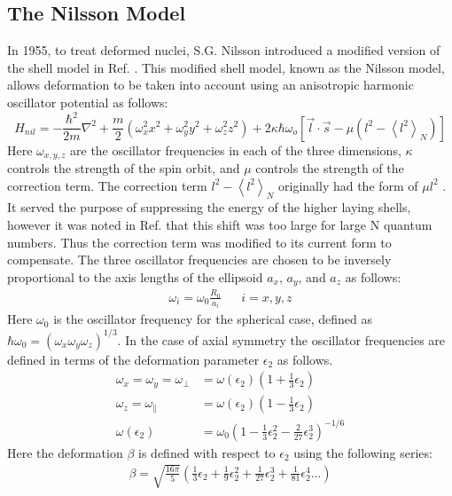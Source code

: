 \subsection{The Nilsson Model}
In 1955, to treat deformed nuclei, S.G. Nilsson introduced a modified version of the shell model in Ref. \cite{nilsson}. This modified shell model, known as the Nilsson model, allows deformation to be taken into account using an anisotropic harmonic oscillator potential as follows:
\begin{equation}
\label{eqn:chp2-nilsson-hamil}
H_{nil}=-\frac{\hbar^{2}}{2m}\nabla^{2} + \frac{m}{2}\left(\omega_{x}^{2}x^{2} + \omega_{y}^{2}y^{2} + \omega_{z}^{2}z^{2}\right) + 2\kappa \hbar \omega_{o}\left[\vec{l}\cdot \vec{s} - \mu \left(l^{2} - \left \langle l^{2} \right \rangle_{N} \right) \right]
\end{equation} 
Here $\omega_{x,y,z}$ are the oscillator frequencies in each of the three dimensions, $\kappa$ controls the strength of the spin orbit, and $\mu$ controls the strength of the correction term. The correction term $l^2 - \left \langle l^{2} \right \rangle_{N}$ originally had the form of $\mu l^2$ \cite{nilsson}. It served the purpose of suppressing the energy of the higher laying shells, however it was noted in Ref. \cite{nilssonCorrection} that this shift was too large for large N quantum numbers. Thus the correction term was modified to its current form to compensate. The three oscillator frequencies are chosen to be inversely proportional to the axis lengths of the ellipsoid $a_x$, $a_y$, and $a_z$ as follows:
\begin{align}
\label{eqn:chp2-nilsson-oscilator-freq}
\omega_i = \omega_0\frac{R_0}{a_i} &  & i=x,y,z
\end{align}
Here $\omega_0$ is the oscillator frequency for the spherical case, defined as $\hbar\omega_0 = (\omega_x \omega_y \omega_z )^{1/3}$. In the case of axial symmetry the oscillator frequencies are defined in terms of the deformation parameter $\epsilon_2$ as follows.
\begin{align}
\label{eqn:chp2-nilsson-oscilator-freq-components}
\omega_{x}=\omega_{y}=\omega_{\bot}&=\omega(\epsilon_2)\left(1+\frac{1}{3}\epsilon_2 \right)\\
\omega_{z}=\omega_{\parallel}&=\omega(\epsilon_2)\left(1-\frac{1}{3}\epsilon_2 \right)\\
\omega(\epsilon_2) &= \omega_0\left(1-\frac{1}{3}\epsilon_2^2-\frac{2}{27}\epsilon_2^3\right)^{-1/6}
\end{align}
Here the deformation $\beta$ is defined with respect to $\epsilon_2$ using the following series:
\begin{align}
\label{eqn:chp2-nilsson-beta-from-epsilon}
\beta = \sqrt{\frac{16 \pi}{5}}\left( \frac{1}{3}\epsilon_2 + \frac{1}{9}\epsilon_2^2 + \frac{1}{27}\epsilon_2^3 +  \frac{1}{81}\epsilon_2^4...\right)
\end{align}

